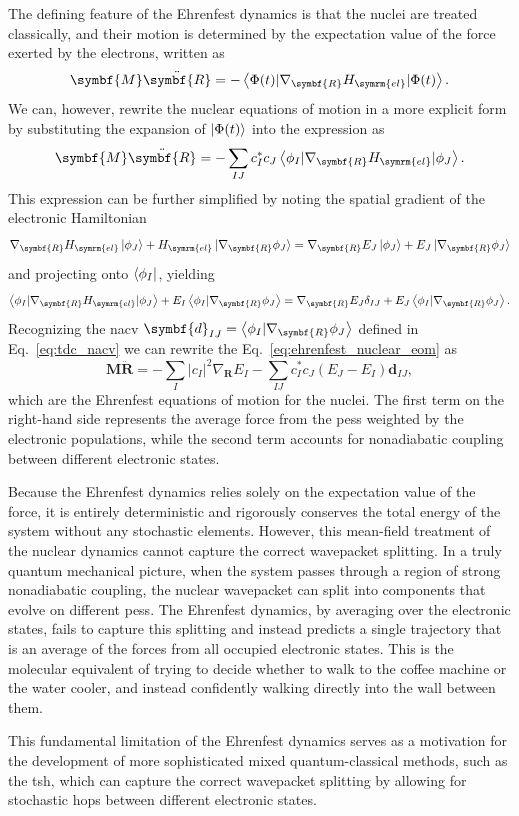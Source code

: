 The defining feature of the Ehrenfest dynamics is that the nuclei are treated classically, and their motion is determined by the expectation value of the force exerted by the electrons, written as
\begin{equation}\label{eq:ehrenfest_nuclear_eom}
\symbf{M}\ddot{\symbf{R}}=-\Braket{\Phi(t)\vert\nabla_{\symbf{R}}H_{\symrm{el}}\vert\Phi(t)}.
\end{equation}
We can, however, rewrite the nuclear equations of motion in a more explicit form by substituting the expansion of $\ket{\Phi(t)}$ into the expression as
\begin{equation}
\symbf{M}\ddot{\symbf{R}}=-\sum_{IJ}c_I^\ast c_J\Braket{\phi_I\vert\nabla_{\symbf{R}}H_{\symrm{el}}\vert\phi_J}.
\end{equation}
This expression can be further simplified by noting the spatial gradient of the electronic Hamiltonian
\begin{equation}
\nabla_{\symbf{R}}H_{\symrm{el}}\ket{\phi_J}+H_{\symrm{el}}\ket{\nabla_{\symbf{R}}\phi_J}=\nabla_{\symbf{R}}E_J\ket{\phi_J}+E_J\ket{\nabla_{\symbf{R}}\phi_J}
\end{equation}
and projecting onto $\bra{\phi_I}$, yielding
\begin{equation}
\Braket{\phi_I\vert\nabla_{\symbf{R}}H_{\symrm{el}}\vert\phi_J}+E_I\Braket{\phi_I\vert\nabla_{\symbf{R}}\phi_J}=\nabla_{\symbf{R}}E_J\delta_{IJ}+E_J\Braket{\phi_I\vert\nabla_{\symbf{R}}\phi_J}.
\end{equation}
Recognizing the \gls{nacv} $\symbf{d}_{IJ}=\Braket{\phi_I\vert\nabla_{\symbf{R}}\phi_J}$ defined in Eq.~\eqref{eq:tdc_nacv} we can rewrite the Eq.~\eqref{eq:ehrenfest_nuclear_eom} as
\begin{equation}
\symbf{M}\ddot{\symbf{R}}=-\sum_I\vert c_I\vert^2\nabla_{\symbf{R}}E_I-\sum_{IJ}c_I^\ast c_J(E_J-E_I)\symbf{d}_{IJ},
\end{equation}
which are the Ehrenfest equations of motion for the nuclei. The first term on the right-hand side represents the average force from the \glspl{pes} weighted by the electronic populations, while the second term accounts for nonadiabatic coupling between different electronic states.

Because the Ehrenfest dynamics relies solely on the expectation value of the force, it is entirely deterministic and rigorously conserves the total energy of the system without any stochastic elements. However, this mean-field treatment of the nuclear dynamics cannot capture the correct wavepacket splitting. In a truly quantum mechanical picture, when the system passes through a region of strong nonadiabatic coupling, the nuclear wavepacket can split into components that evolve on different \glspl{pes}. The Ehrenfest dynamics, by averaging over the electronic states, fails to capture this splitting and instead predicts a single trajectory that is an average of the forces from all occupied electronic states. This is the molecular equivalent of trying to decide whether to walk to the coffee machine or the water cooler, and instead confidently walking directly into the wall between them.

This fundamental limitation of the Ehrenfest dynamics serves as a motivation for the development of more sophisticated mixed quantum-classical methods, such as the \gls{tsh}, which can capture the correct wavepacket splitting by allowing for stochastic hops between different electronic states.
